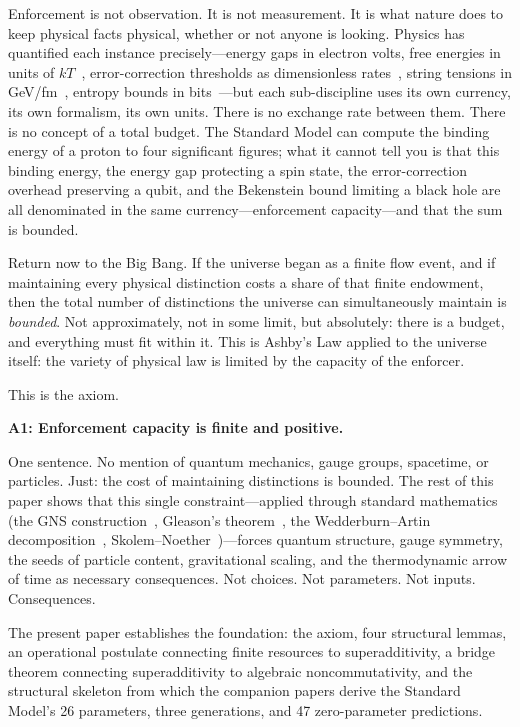 \documentclass[11pt]{article}
\begin{document}
Enforcement is not observation.  It is not measurement.  It is what nature does to keep physical facts physical, whether or not anyone is looking.  Physics has quantified each instance precisely---energy gaps in electron volts, free energies in units of $kT$~\cite{Jaynes1957}, error-correction thresholds as dimensionless rates~\cite{NielsenChuang2000}, string tensions in GeV/fm~\cite{Wilson1974}, entropy bounds in bits~\cite{Bekenstein1981}---but each sub-discipline uses its own currency, its own formalism, its own units.  There is no exchange rate between them.  There is no concept of a total budget.  The Standard Model can compute the binding energy of a proton to four significant figures; what it cannot tell you is that this binding energy, the energy gap protecting a spin state, the error-correction overhead preserving a qubit, and the Bekenstein bound limiting a black hole are all denominated in the same currency---enforcement capacity---and that the sum is bounded.

Return now to the Big Bang.  If the universe began as a finite flow event, and if maintaining every physical distinction costs a share of that finite endowment, then the total number of distinctions the universe can simultaneously maintain is \emph{bounded}.  Not approximately, not in some limit, but absolutely: there is a budget, and everything must fit within it.  This is Ashby's Law applied to the universe itself: the variety of physical law is limited by the capacity of the enforcer.

This is the axiom.

\begin{center}
\textbf{A1: Enforcement capacity is finite and positive.}
\end{center}

\noindent One sentence.  No mention of quantum mechanics, gauge groups, spacetime, or particles.  Just: the cost of maintaining distinctions is bounded.  The rest of this paper shows that this single constraint---applied through standard mathematics (the GNS construction~\cite{GNS1943}, Gleason's theorem~\cite{Gleason1957}, the Wedderburn--Artin decomposition~\cite{Wedderburn1908,Artin1927}, Skolem--Noether~\cite{Skolem1927,Noether1933})---forces quantum structure, gauge symmetry, the seeds of particle content, gravitational scaling, and the thermodynamic arrow of time as necessary consequences.  Not choices.  Not parameters.  Not inputs.  Consequences.

The present paper establishes the foundation: the axiom, four structural lemmas, an operational postulate connecting finite resources to superadditivity, a bridge theorem connecting superadditivity to algebraic noncommutativity, and the structural skeleton from which the companion papers derive the Standard Model's 26 parameters, three generations, and 47 zero-parameter predictions.
\end{document}
